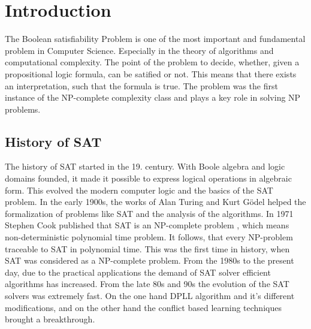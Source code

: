 \documentclass{article}
\begin{document}
\vspace*{\fill}

\newpage







\section{Introduction}
\label{sec:intro}

The Boolean satisfiability Problem is one of the most important and fundamental problem in Computer Science. Especially in the theory of algorithms and computational complexity. The point of the problem to decide, whether, given a propositional logic formula, can be satified or not. This means that there exists an interpretation, such that the formula is true. The problem was the first instance of the NP-complete complexity class and plays a key role in solving NP problems.

\subsection{History of SAT}
The history of SAT started in the 19. century. With Boole algebra and logic domains founded, it made it possible to express logical operations in algebraic form. This evolved the modern computer logic and the basics of the SAT problem. In the early 1900s, the works of Alan Turing \cite{turing} and Kurt Gödel helped the formalization of problems like SAT and the analysis of the algorithms. In 1971 Stephen Cook published that SAT is an NP-complete problem \cite{satIsNPComplete}, which means non-deterministic polynomial time problem. It follows, that every NP-problem traceable to SAT in polynomial time. This was the first time in history, when SAT was considered as a NP-complete problem. From the 1980s to the present day, due to the practical applications the demand of SAT solver efficient algorithms has increased. From the late 80s and 90s the evolution of the SAT solvers was extremely fast. On the one hand DPLL algorithm \cite{dpll} and it's different modifications, and on the other hand the conflict based learning techniques brought a breakthrough.
\end{document}
